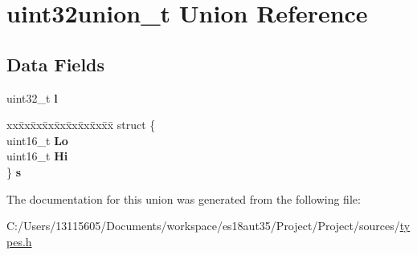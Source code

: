 \hypertarget{unionuint32union__t}{}\section{uint32union\+\_\+t Union Reference}
\label{unionuint32union__t}
\subsection*{Data Fields}
\begin{DoxyCompactItemize}
\item 
\hypertarget{unionuint32union__t_a02b7aaa4708411c52446dc5528f66c25}{}uint32\+\_\+t {\bfseries l}\label{unionuint32union__t_a02b7aaa4708411c52446dc5528f66c25}

\item 
\hypertarget{unionuint32union__t_a00b12f209c91b64c009f2eecafd298c2}{}\begin{tabbing}
xx\=xx\=xx\=xx\=xx\=xx\=xx\=xx\=xx\=\kill
struct \{\\
\>uint16\_t {\bfseries Lo}\\
\>uint16\_t {\bfseries Hi}\\
\} {\bfseries s}\label{unionuint32union__t_a00b12f209c91b64c009f2eecafd298c2}
\\

\end{tabbing}\end{DoxyCompactItemize}


The documentation for this union was generated from the following file\+:\begin{DoxyCompactItemize}
\item 
C\+:/\+Users/13115605/\+Documents/workspace/es18aut35/\+Project/\+Project/sources/\hyperlink{types_8h}{types.\+h}\end{DoxyCompactItemize}
